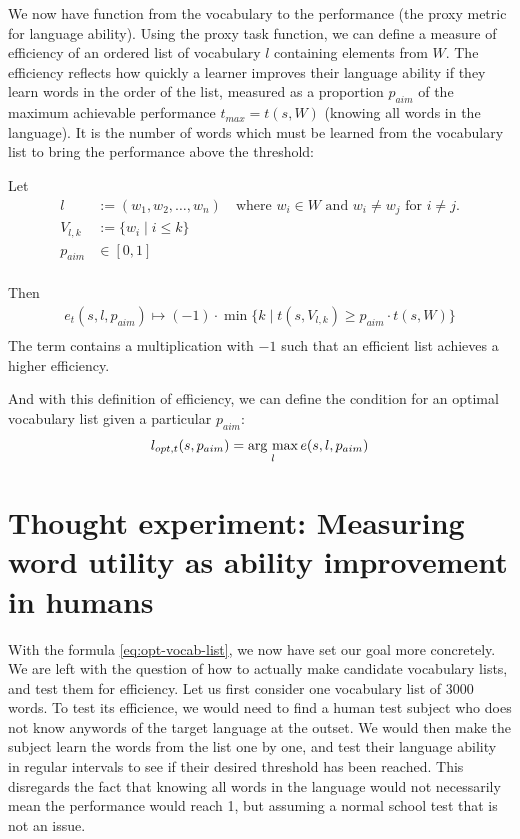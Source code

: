 We now have function from the vocabulary to the performance (the proxy metric for language ability).
Using the proxy task function, we can define a measure of efficiency of an ordered list of vocabulary $l$ containing elements from $W$.
The efficiency reflects how quickly a learner improves their language ability if they learn words in the order of the list, measured as a proportion $p_{aim}$ of the maximum achievable performance $t_{max} = t(s,W)$ (knowing all words in the language).
It is the number of words which must be learned from the vocabulary list to bring the performance above the threshold:

Let
\begin{align*}
	l & := (w_1, w_2, \dots, w_n) \quad \text{where } w_i \in W \text{ and } w_i \neq w_j \text{ for } i \neq j. \\
	V_{l, k} &:= \{w_i \mid i \leq k\}\\
	p_{aim} & \in  [0, 1] \\
\end{align*}

Then 
\begin{align*}
	e_{t}(s, l, p_{aim}) \mapsto ( -1 )  \cdot  \min\{ k \mid  t(s,  V_{l, k}) \geq p_{aim} \cdot t(s, W)\} \\
\end{align*}
The term contains a multiplication with $-1$ such that an efficient list achieves a higher efficiency.

And with this definition of efficiency, we can define the condition for an optimal vocabulary list given a particular $p_{aim}$:
\begin{align} \label{eq:opt-vocab-list}
	l_{opt, t} (s, p_{aim}) = \mathop{\rm arg~max}\limits_{l} e(s, l, p_{aim}) 
\end{align}



\section{Thought experiment: Measuring word utility as ability improvement in humans}


With the formula \ref{eq:opt-vocab-list}, we now have set our goal more concretely.
We are left with the question of how to actually make candidate vocabulary lists, and test them for efficiency.
Let us first consider one vocabulary list of 3000 words.
To test its efficience, we would need to find a human test subject who does not know anywords of the target language at the outset.
We would then make the subject learn the words from the list one by one, and test their language ability in regular intervals to see if their desired threshold has been reached.
This disregards the fact that knowing all words in the language would not necessarily mean the performance would reach 1, but assuming a normal school test that is not an issue.

